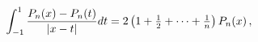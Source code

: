 \[\int_{-1}^{1}\frac{\mathop{P_{n}\/}\nolimits\!\left(x\right)-\mathop{P_{n}\/}%
\nolimits\!\left(t\right)}{|x-t|}dt=2\left(1+\tfrac{1}{2}+\dots+\tfrac{1}{n}%
\right)\mathop{P_{n}\/}\nolimits\!\left(x\right),\]